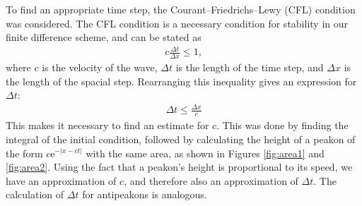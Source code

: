 To find an appropriate time step, the Courant–Friedrichs–Lewy (CFL) condition was considered. The CFL condition is a necessary condition for stability in our finite difference scheme, and can be stated as
\begin{align}
c\frac{\Delta t}{\Delta x} \leq 1,
\end{align}
where $c$ is the velocity of the wave, $\Delta t$ is the length of the time step, and $\Delta x$ is the length of the spacial step. Rearranging this inequality gives an expression for $\Delta t$:
\begin{align}
\Delta t \leq \frac{\Delta x}{c}
\end{align}
This makes it necessary to find an estimate for $c$. This was done by finding the integral of the initial condition, followed by calculating the height of a peakon of the form $c\text{e}^{-|x-ct|}$ with the same area, as shown in Figures \ref{fig:area1} and \ref{fig:area2}. Using the fact that a peakon's height is proportional to its speed, we have an approximation of $c$, and therefore also an approximation of $\Delta t$. The calculation of $\Delta t$ for antipeakons is analogous. \\
